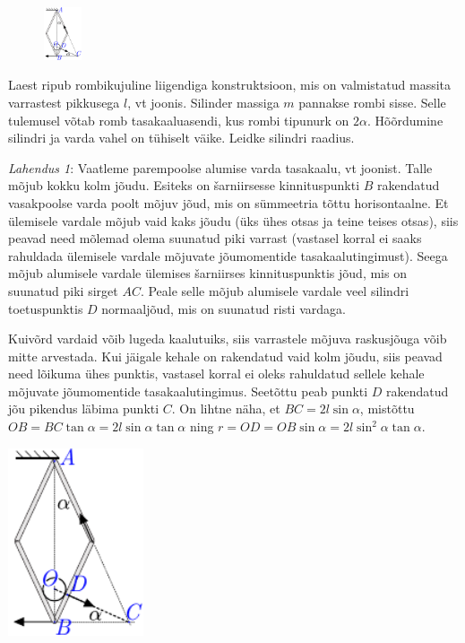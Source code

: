 
\begin{figure}
  \vspace*{-0mm}
  \includegraphics[width = 0.1\textwidth]{2024-v3g-07-yl.pdf}
\end{figure}
Laest ripub rombikujuline liigendiga konstruktsioon, mis on valmistatud massita varrastest pikkusega $l$, vt joonis. Silinder massiga $m$ pannakse rombi sisse. Selle tulemusel võtab romb tasakaaluasendi, kus rombi tipunurk on $2\alpha$. Hõõrdumine silindri ja varda vahel on tühiselt väike. Leidke silindri raadius.


\hint

\solu
\textit{Lahendus 1}: Vaatleme parempoolse alumise varda tasakaalu, vt joonist. Talle mõjub kokku kolm jõudu. Esiteks on šarniirsesse kinnituspunkti $B$ rakendatud vasakpoolse varda poolt mõjuv jõud, mis on sümmeetria tõttu horisontaalne. Et ülemisele vardale mõjub vaid kaks jõudu (üks ühes otsas ja teine teises otsas), siis peavad need mõlemad olema suunatud piki varrast (vastasel korral ei saaks rahuldada ülemisele vardale mõjuvate  jõumomentide tasakaalutingimust). Seega mõjub alumisele vardale ülemises šarniirses kinnituspunktis jõud, mis on suunatud piki sirget $AC$. Peale selle mõjub alumisele vardale veel silindri toetuspunktis $D$ normaaljõud, mis on suunatud risti vardaga.

Kuivõrd vardaid võib lugeda kaalutuiks, siis varrastele mõjuva raskusjõuga võib mitte arvestada. Kui jäigale kehale on rakendatud vaid kolm jõudu, siis peavad need lõikuma ühes punktis, vastasel korral ei oleks rahuldatud sellele kehale mõjuvate  jõumomentide tasakaalutingimus. Seetõttu peab punkti $D$ rakendatud jõu pikendus läbima punkti $C$. On lihtne näha, et $BC=2l\sin\alpha$, mistõttu $OB=BC\tan\alpha=2l\sin\alpha\tan\alpha$ ning $r=OD=OB\sin\alpha=2l\sin^2\alpha\tan\alpha$.
\begin{center}
  \includegraphics[width=0.3\textwidth]{2024-v3g-07-yl.pdf}
\end{center}

